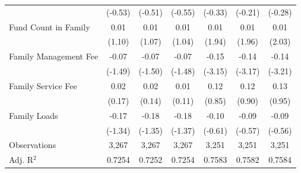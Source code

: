 {\begin{tabular}{l*{6}{c}}
                    &     (-0.53)         &     (-0.51)         &     (-0.55)         &     (-0.33)         &     (-0.21)         &     (-0.28)         \\
\addlinespace
Fund Count in Family&        0.01         &        0.01         &        0.01         &        0.01\sym{*}  &        0.01\sym{*}  &        0.01\sym{**} \\
                    &      (1.10)         &      (1.07)         &      (1.04)         &      (1.94)         &      (1.96)         &      (2.03)         \\
\addlinespace
Family Management Fee&       -0.07         &       -0.07         &       -0.07         &       -0.15\sym{***}&       -0.14\sym{***}&       -0.14\sym{***}\\
                    &     (-1.49)         &     (-1.50)         &     (-1.48)         &     (-3.15)         &     (-3.17)         &     (-3.21)         \\
\addlinespace
Family Service Fee  &        0.02         &        0.02         &        0.01         &        0.12         &        0.12         &        0.13         \\
                    &      (0.17)         &      (0.14)         &      (0.11)         &      (0.85)         &      (0.90)         &      (0.95)         \\
\addlinespace
Family Loads        &       -0.17         &       -0.18         &       -0.18         &       -0.10         &       -0.09         &       -0.09         \\
                    &     (-1.34)         &     (-1.35)         &     (-1.37)         &     (-0.61)         &     (-0.57)         &     (-0.56)         \\
\midrule
Observations        &       3,267         &       3,267         &       3,267         &       3,251         &       3,251         &       3,251         \\
Adj. R$^{2}$        &      0.7254         &      0.7252         &      0.7254         &      0.7583         &      0.7582         &      0.7584         \\
\bottomrule
\end{tabular}
}
